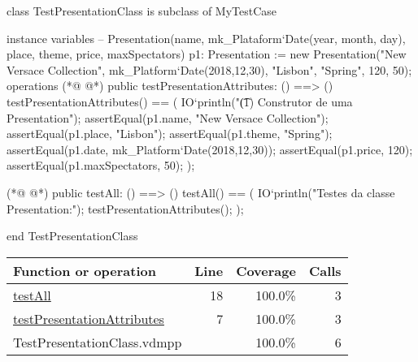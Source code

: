 \begin{vdmpp}[breaklines=true]
class TestPresentationClass is subclass of MyTestCase

instance variables
 -- Presentation(name, mk_Plataform`Date(year, month, day), place, theme, price, maxSpectators)
 p1: Presentation := new Presentation("New Versace Collection", mk_Platform`Date(2018,12,30), "Lisbon", "Spring", 120, 50);
operations
(*@
\label{testPresentationAttributes:7}
@*)
 public testPresentationAttributes: () ==> ()
 testPresentationAttributes() == (
  IO`println("\t (1) Construtor de uma Presentation");
  assertEqual(p1.name, "New Versace Collection");
  assertEqual(p1.place, "Lisbon");
  assertEqual(p1.theme, "Spring");
  assertEqual(p1.date, mk_Platform`Date(2018,12,30));
  assertEqual(p1.price, 120);
  assertEqual(p1.maxSpectators, 50);
 );
  
(*@
\label{testAll:18}
@*)
 public testAll: () ==> ()
 testAll() == (
 IO`println("Testes da classe Presentation:");
  testPresentationAttributes();
 );
 
end TestPresentationClass
\end{vdmpp}
\bigskip
\begin{longtable}{|l|r|r|r|}
\hline
Function or operation & Line & Coverage & Calls \\
\hline
\hline
\hyperref[testAll:18]{testAll} & 18&100.0\% & 3 \\
\hline
\hyperref[testPresentationAttributes:7]{testPresentationAttributes} & 7&100.0\% & 3 \\
\hline
\hline
TestPresentationClass.vdmpp & & 100.0\% & 6 \\
\hline
\end{longtable}

